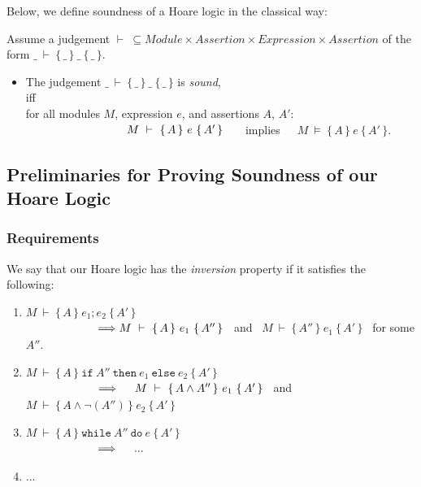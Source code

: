 Below, we define soundness of a Hoare logic in the classical way:

\begin{definition}

 
Assume a judgement $\vdash \ \subseteq Module \times Assertion \times Expression \times Assertion$ of the form
$\_ \ \vdash\  \{\, \_ \,  \}\ \_ \  \{\, \_ \, \}$.\\
\begin{itemize}
\item
The judgement $\_ \ \vdash\  \{\, \_ \,  \}\ \_ \  \{\, \_ \, \}$ is {\emph {sound}}, \\ iff \\
for all modules $M$, expression $e$, and assertions $A$, $A'$:\\
$\strut\hspace{3cm} \ M\ \vdash\  \{\, A \,  \}\ e\  \{\, A' \, \}$ \ \ \  implies\ \ \ 
 $M\ \models\  \{\, A \,  \}\ e\  \{\, A' \, \}$.
\end{itemize}
 \end{definition}
 
 
 \subsection{Preliminaries for Proving Soundness of our Hoare Logic}
 
 \subsubsection{Requirements}
 
 
 \begin{definition}[Inversion] We say that our Hoare logic has the \emph{ inversion} property if it satisfies the  following:
 \begin{enumerate}
 \item
 $ M\ \vdash\  \{\, A \,  \}\ e_1; e_2 \  \{\, A' \, \}$\\
 $\strut \hspace{2cm}\ \Longrightarrow M\ \vdash\  \{\, A \,  \}\ e_1  \  \{\, A'' \, \}$ \ and \ $M\ \vdash\  \{\, A'' \,  \}\ e_1  \  \{\, A' \, \}$ \ for some $A''$.
 \item
 $ M\ \vdash\  \{\, A \,  \}\ \texttt{if}\ A''\ \texttt{then}\ e_1\ \texttt{else}\ e_2 \  \{\, A' \, \}$\\
 $\strut \hspace{2cm}\ \Longrightarrow
  \ \ \ \ M\ \vdash\  \{\, A\wedge A'' \,  \}\ e_1  \  \{\, A' \, \}$ \ and \ $M\ \vdash\  \{\, A\wedge \neg(A'') \,  \}\ e_2  \  \{\, A' \, \}$  
   \item
$ M\ \vdash\  \{\, A \,  \}\ \texttt{while}\ A''\ \texttt{do}\ e\  \{\, A' \, \}$\\
 $\strut \hspace{2cm}\ \Longrightarrow
  \ \ \ \ ... $  
   \item
...

 \end{enumerate}
 \end{definition}
 
